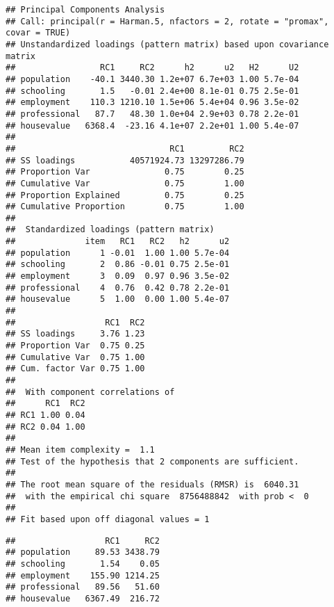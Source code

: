 \documentclass[]{book}
\newenvironment{Shaded}{\begin{snugshade}}{\end{snugshade}}
\newcommand{\KeywordTok}[1]{\textcolor[rgb]{0.13,0.29,0.53}{\textbf{{#1}}}}
\newcommand{\DecValTok}[1]{\textcolor[rgb]{0.00,0.00,0.81}{{#1}}}
\newcommand{\FloatTok}[1]{\textcolor[rgb]{0.00,0.00,0.81}{{#1}}}
\newcommand{\CommentTok}[1]{\textcolor[rgb]{0.56,0.35,0.01}{\textit{{#1}}}}
\newcommand{\NormalTok}[1]{{#1}}
\begin{document}
\begin{verbatim}
## Principal Components Analysis
## Call: principal(r = Harman.5, nfactors = 2, rotate = "promax", covar = TRUE)
## Unstandardized loadings (pattern matrix) based upon covariance matrix
##                 RC1     RC2      h2      u2   H2      U2
## population    -40.1 3440.30 1.2e+07 6.7e+03 1.00 5.7e-04
## schooling       1.5   -0.01 2.4e+00 8.1e-01 0.75 2.5e-01
## employment    110.3 1210.10 1.5e+06 5.4e+04 0.96 3.5e-02
## professional   87.7   48.30 1.0e+04 2.9e+03 0.78 2.2e-01
## housevalue   6368.4  -23.16 4.1e+07 2.2e+01 1.00 5.4e-07
## 
##                               RC1         RC2
## SS loadings           40571924.73 13297286.79
## Proportion Var               0.75        0.25
## Cumulative Var               0.75        1.00
## Proportion Explained         0.75        0.25
## Cumulative Proportion        0.75        1.00
## 
##  Standardized loadings (pattern matrix)
##              item   RC1   RC2   h2      u2
## population      1 -0.01  1.00 1.00 5.7e-04
## schooling       2  0.86 -0.01 0.75 2.5e-01
## employment      3  0.09  0.97 0.96 3.5e-02
## professional    4  0.76  0.42 0.78 2.2e-01
## housevalue      5  1.00  0.00 1.00 5.4e-07
## 
##                  RC1  RC2
## SS loadings     3.76 1.23
## Proportion Var  0.75 0.25
## Cumulative Var  0.75 1.00
## Cum. factor Var 0.75 1.00
## 
##  With component correlations of 
##      RC1  RC2
## RC1 1.00 0.04
## RC2 0.04 1.00
## 
## Mean item complexity =  1.1
## Test of the hypothesis that 2 components are sufficient.
## 
## The root mean square of the residuals (RMSR) is  6040.31 
##  with the empirical chi square  8756488842  with prob <  0 
## 
## Fit based upon off diagonal values = 1
\end{verbatim}

\begin{Shaded}
\end{Shaded}

\begin{verbatim}
##                  RC1     RC2
## population     89.53 3438.79
## schooling       1.54    0.05
## employment    155.90 1214.25
## professional   89.56   51.60
## housevalue   6367.49  216.72
\end{verbatim}

\begin{Shaded}
\end{Shaded}
\end{document}
